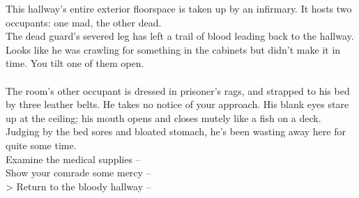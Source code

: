 This hallway's entire exterior floorspace is taken up by an infirmary. It hosts two occupants: one mad, the other dead.\\

The dead guard's severed leg has left a trail of blood leading back to the hallway. Looks like he was crawling for something in the cabinets but didn't make it in time. You tilt one of them open.\\
\\

The room's other occupant is dressed in prisoner's rags, and strapped to his bed by three leather belts. He takes no notice of your approach. His blank eyes stare up at the ceiling; his mouth opens and closes mutely like a fish on a deck. Judging by the bed sores and bloated stomach, he's been wasting away here for quite some time.\\

 Examine the medical supplies -- \\
 Show your comrade some mercy -- \\
> Return to the bloody hallway -- 